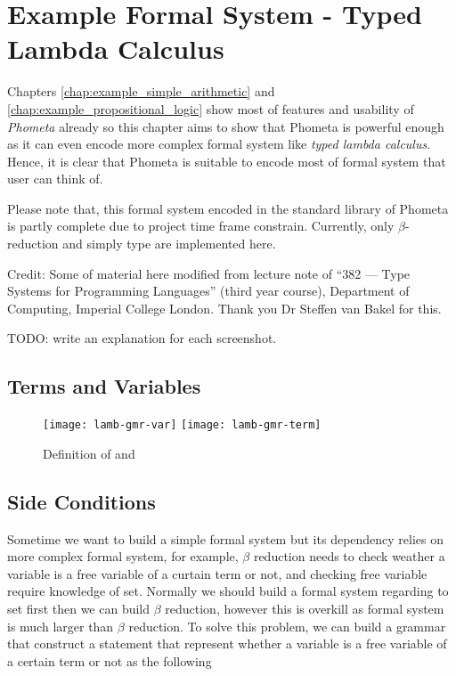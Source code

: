 \documentclass[master.tex]{subfiles}
\begin{document}
\chapter{Example Formal System - Typed Lambda Calculus}
\label{chap:example_lambda_calculus}

Chapters \ref{chap:example_simple_arithmetic} and
\ref{chap:example_propositional_logic} show most of features and usability of
\emph{Phometa} already so this chapter aims to show that Phometa is powerful
enough as it can even encode more complex formal system like \emph{typed lambda
  calculus}. Hence, it is clear that Phometa is suitable to encode most of
formal system that user can think of.

Please note that, this formal system encoded in the standard library of Phometa
is partly complete due to project time frame constrain. Currently, only
$\beta$-reduction and simply type are implemented here.

Credit: Some of material here modified from lecture note of ``382 --- Type
Systems for Programming Languages'' (third year course), Department of
Computing, Imperial College London. Thank you Dr Steffen van Bakel for this.

TODO: write an explanation for each screenshot.

\section{Terms and Variables}

\begin{figure}[H]
    \centering
\begin{minipage}{0.7\textwidth}
    \texttt{[image: lamb-gmr-var]}
    \texttt{[image: lamb-gmr-term]}
\end{minipage}
\caption{Definition of  and }
\end{figure}
\section{Side Conditions}
Sometime we want to build a simple formal system but its dependency relies on
more complex formal system, for example, $\beta$ reduction needs to check
weather a variable is a free variable of a curtain term or not, and checking
free variable require knowledge of set. Normally we should build a formal system
regarding to set first then we can build $\beta$ reduction, however this is
overkill as formal system is much larger than $\beta$ reduction. To solve this
problem, we can build a grammar that construct a statement that represent
whether a variable is a free variable of a certain term or not as the following
\end{document}
